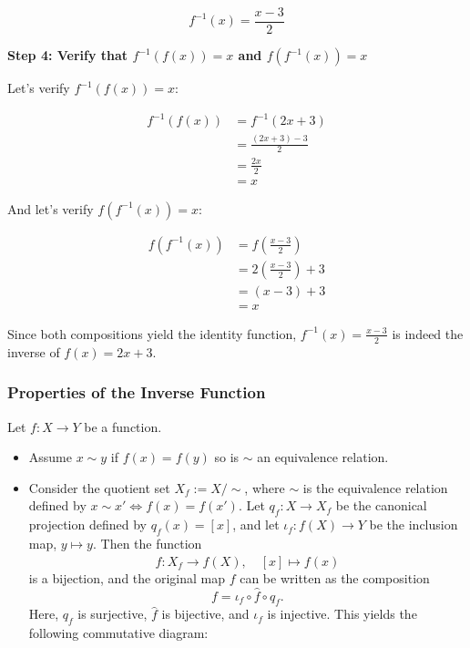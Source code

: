 \[
	f^{-1}(x) = \frac{x - 3}{2}
\]

\textbf{Step 4: Verify that \(f^{-1} (f (x)) = x\) and \(f(f^{-1} (x)) = x\)}

Let's verify \(f^{-1} (f (x)) = x\):

\begin{align*}
	f^{-1}(f(x)) & = f^{-1}(2x + 3)         \\
	             & = \frac{(2x + 3) - 3}{2} \\
	             & = \frac{2x}{2}           \\
	             & = x
\end{align*}

And let's verify \(f(f^{-1}(x)) = x\):

\begin{align*}
	f(f^{-1}(x)) & = f\left(\frac{x - 3}{2}\right)     \\
	             & = 2\left(\frac{x - 3}{2}\right) + 3 \\
	             & = (x - 3) + 3                       \\
	             & = x
\end{align*}

Since both compositions yield the identity function, \(f^{-1} (x) = \frac{x - 3}{2}\) is indeed the inverse of \(f (x) = 2x + 3\).

\subsubsection{Properties of the Inverse Function}

Let \(f:X\to Y\) be a function.

\begin{itemize}

	\item Assume \(x \sim y \) if \(f(x)= f(y)\) so is \(\sim\) an equivalence relation.

	\item Consider the quotient set \( X_f := X/\sim \), where \( \sim \) is the equivalence relation defined by \( x \sim x' \iff f(x) = f(x') \). Let \( q_f : X \to X_f \) be the canonical projection defined by \( q_f(x) = [x] \), and let \( \iota_f : f(X) \to Y \) be the inclusion map, \( y \mapsto y \). Then the function
	      \[
		      \hat{f} : X_f \to f(X), \quad [x] \mapsto f(x)
	      \]
	      is a bijection, and the original map \( f \) can be written as the composition
	      \[
		      f = \iota_f \circ \hat{f} \circ q_f.
	      \]
	      Here, \( q_f \) is surjective, \( \hat{f} \) is bijective, and \( \iota_f \) is injective. This yields the following commutative diagram:
	      
		  \begin{center}
	      \end{center}

\end{itemize}

